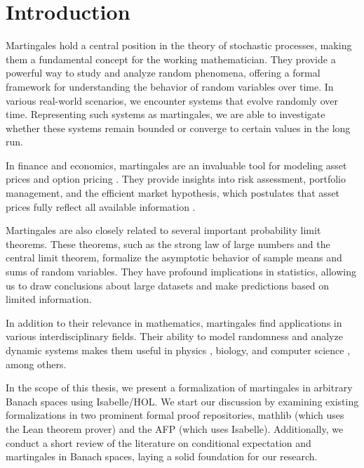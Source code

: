 ﻿%

\chapter{Introduction}\label{chapter:introduction}

Martingales hold a central position in the theory of stochastic processes, making them a fundamental concept for the working mathematician. They provide a powerful way to study and analyze random phenomena, offering a formal framework for understanding the behavior of random variables over time. In various real-world scenarios, we encounter systems that evolve randomly over time. Representing such systems as martingales, we are able to investigate whether these systems remain bounded or converge to certain values in the long run.

In finance and economics, martingales are an invaluable tool for modeling asset prices \cite{fama1965} and option pricing \cite{Musiela_Rutkowski_2005}. They provide insights into risk assessment, portfolio management, and the efficient market hypothesis, which postulates that asset prices fully reflect all available information \cite{yaes1989}. 

Martingales are also closely related to several important probability limit theorems. These theorems, such as the strong law of large numbers and the central limit theorem, formalize the asymptotic behavior of sample means and sums of random variables. They have profound implications in statistics, allowing us to draw conclusions about large datasets and make predictions based on limited information.

In addition to their relevance in mathematics, martingales find applications in various interdisciplinary fields. Their ability to model randomness and analyze dynamic systems makes them useful in physics \cite{roldan2023}, biology, and computer science \cite{mitzenmacher_upfal_2005}, among others.

In the scope of this thesis, we present a formalization of martingales in arbitrary Banach spaces using Isabelle/HOL. We start our discussion by examining existing formalizations in two prominent formal proof repositories, \textsf{mathlib} (which uses the Lean theorem prover) and the \textsf{\ac{AFP}} (which uses Isabelle). Additionally, we conduct a short review of the literature on conditional expectation and martingales in Banach spaces, laying a solid foundation for our research.

